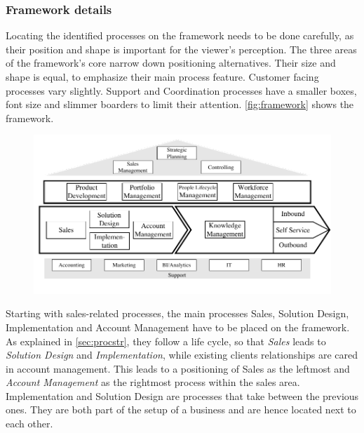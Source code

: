 	\subsubsection{Framework details}
	
	Locating the identified processes on the framework needs to be done carefully, as their position and shape is important for the viewer's perception. The three areas of the framework's core narrow down positioning alternatives. Their size and shape is equal, to emphasize their main process feature. Customer facing processes vary slightly. Support and Coordination processes have a smaller boxes, font size and slimmer boarders to limit their attention. \Fig \ref{fig:framework} shows the framework.
	
		\begin{figure}[caption={Framework}, label={fig:framework}]
		{	\includegraphics[width=.9\textwidth]{figures/framework.pdf}}
	\end{figure} 
	
	
	 Starting with sales-related processes, the main processes Sales, Solution Design, Implementation and Account Management have to be placed on the framework. As explained in \ref{sec:procstr}, they follow a life cycle, so that \textit{Sales} leads to \textit{Solution Design} and \textit{Implementation}, while existing clients relationships are cared in account management. This leads to a positioning of Sales as the leftmost and \textit{Account Management} as the rightmost process within the sales area. Implementation and Solution Design are processes that take between the previous ones. They are both part of the setup of a business and are hence located next to each other. 
	 
